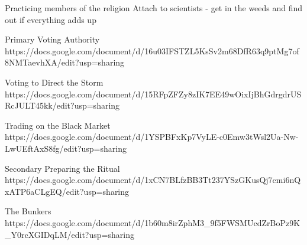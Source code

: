 \documentclass[char]{GL2020}
\begin{document}
\name{\cTest{}}






Practicing members of the religion	Attach to scientists - get in the weeds and find out if everything adds up

Primary
Voting Authority
https://docs.google.com/document/d/16u03IFSTZL5KsSv2m68DfR63q9ptMg7of8NMTaevhXA/edit?usp=sharing

Voting to Direct the Storm
https://docs.google.com/document/d/15RFpZFZy8zIK7EE49wOixIjBhGdrgdrUSRcJULT45kk/edit?usp=sharing

Trading on the Black Market
https://docs.google.com/document/d/1YSPBFxKp7VyLE-c0Emw3tWsl2Ua-Nw-LwUEftAxS8fg/edit?usp=sharing

Secondary
Preparing the Ritual
https://docs.google.com/document/d/1xCN7BLfzBB3Tt237YSzGKusQj7cmi6nQxATP6aCLgEQ/edit?usp=sharing

The Bunkers
https://docs.google.com/document/d/1b60m8irZphM3_9f5FWSMUcdZrBoPz9K_Y0rcXGIDqLM/edit?usp=sharing
\end{document}
